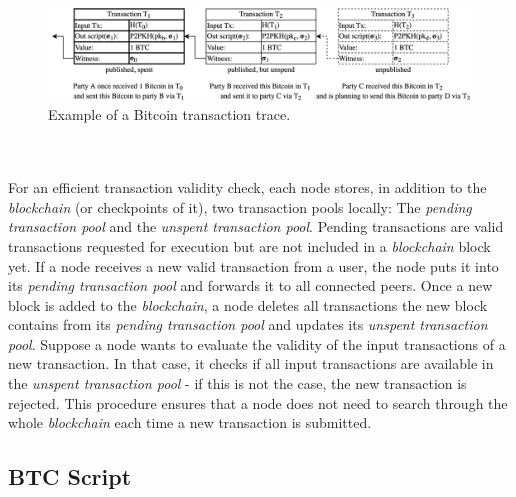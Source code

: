 \documentclass{cacthesis}
\begin{document}
        \begin{figure}
          \includegraphics[width=\linewidth]{images/basic_transaction_figure.png}
          \caption{Example of a Bitcoin transaction trace.}
          \label{fig:tx1}
        \end{figure}
        \\\\ For an efficient transaction validity check, each node stores, in addition to the \textit{blockchain} (or checkpoints of it), two transaction pools locally: The \textit{pending transaction pool} and the \textit{unspent transaction pool}. Pending transactions are valid transactions requested for execution but are not included in a \textit{blockchain} block yet. If a node receives a new valid transaction from a user, the node puts it into its \textit{pending transaction pool} and forwards it to all connected peers. Once a new block is added to the \textit{blockchain}, a node deletes all transactions the new block contains from its \textit{pending transaction pool} and updates its \textit{unspent transaction pool}. Suppose a node wants to evaluate the validity of the input transactions of a new transaction. In that case, it checks if all input transactions are available in the \textit{unspent transaction pool} - if this is not the case, the new transaction is rejected. This procedure ensures that a node does not need to search through the whole \textit{blockchain} each time a new transaction is submitted. \\

        \subsection{BTC Script}
        \label{sub:BTCScript}
        
\end{document}
